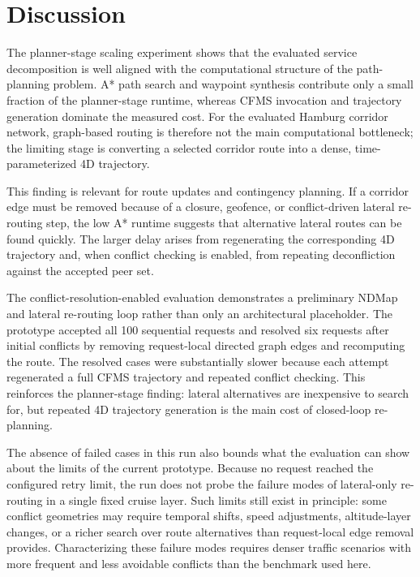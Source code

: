 \section{Discussion}
\label{sec:discussion}

The planner-stage scaling experiment shows that the evaluated service decomposition is well aligned with the computational structure of the path-planning problem. A* path search and waypoint synthesis contribute only a small fraction of the planner-stage runtime, whereas CFMS invocation and trajectory generation dominate the measured cost. For the evaluated Hamburg corridor network, graph-based routing is therefore not the main computational bottleneck; the limiting stage is converting a selected corridor route into a dense, time-parameterized 4D trajectory.

This finding is relevant for route updates and contingency planning. If a corridor edge must be removed because of a closure, geofence, or conflict-driven lateral re-routing step, the low A* runtime suggests that alternative lateral routes can be found quickly. The larger delay arises from regenerating the corresponding 4D trajectory and, when conflict checking is enabled, from repeating deconfliction against the accepted peer set.

The conflict-resolution-enabled evaluation demonstrates a preliminary NDMap and lateral re-routing loop rather than only an architectural placeholder. The prototype accepted all 100 sequential requests and resolved six requests after initial conflicts by removing request-local directed graph edges and recomputing the route. The resolved cases were substantially slower because each attempt regenerated a full CFMS trajectory and repeated conflict checking. This reinforces the planner-stage finding: lateral alternatives are inexpensive to search for, but repeated 4D trajectory generation is the main cost of closed-loop re-planning.

The absence of failed cases in this run also bounds what the evaluation can show about the limits of the current prototype. Because no request reached the configured retry limit, the run does not probe the failure modes of lateral-only re-routing in a single fixed cruise layer. Such limits still exist in principle: some conflict geometries may require temporal shifts, speed adjustments, altitude-layer changes, or a richer search over route alternatives than request-local edge removal provides. Characterizing these failure modes requires denser traffic scenarios with more frequent and less avoidable conflicts than the benchmark used here.

